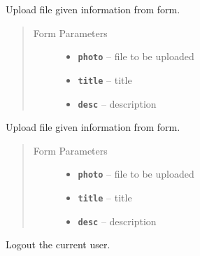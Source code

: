 \documentclass[letterpaper,10pt,english]{sphinxmanual}
\begin{document}
\begin{fulllineitems}
\label{users:get--user-upload}
Upload file given information from form.
\begin{quote}\begin{description}
\item[{Form Parameters}] \leavevmode\begin{itemize}
\item {} 
\textbf{\texttt{photo}} -- file to be uploaded

\item {} 
\textbf{\texttt{title}} -- title

\item {} 
\textbf{\texttt{desc}} -- description

\end{itemize}

\end{description}\end{quote}

\end{fulllineitems}



\begin{fulllineitems}
\label{users:post--user-upload}
Upload file given information from form.
\begin{quote}\begin{description}
\item[{Form Parameters}] \leavevmode\begin{itemize}
\item {} 
\textbf{\texttt{photo}} -- file to be uploaded

\item {} 
\textbf{\texttt{title}} -- title

\item {} 
\textbf{\texttt{desc}} -- description

\end{itemize}

\end{description}\end{quote}

\end{fulllineitems}



\begin{fulllineitems}
\label{users:get--user-logout}
Logout the current user.

\end{fulllineitems}
\end{document}
